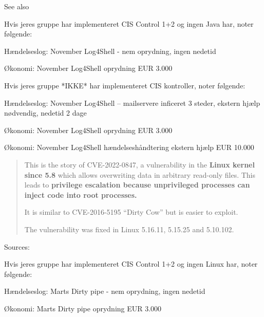 \documentclass[Screen16to9,17pt]{foils}
\begin{document}
See also 




Hvis jeres gruppe har implementeret CIS Control 1+2 og ingen Java har, noter følgende:
\begin{list2}
\item Hændelseslog: November Log4Shell - nem oprydning, ingen nedetid
\item Økonomi: November Log4Shell oprydning EUR 3.000
\end{list2}


Hvis jeres gruppe *IKKE* har implementeret CIS kontroller, noter følgende:
\begin{list2}
\item Hændelseslog: November Log4Shell -- mailservere inficeret 3 steder, ekstern hjælp nødvendig, nedetid 2 dage
\item Økonomi: November Log4Shell oprydning EUR 3.000
\item Økonomi: November Log4Shell hændelseshåndtering ekstern hjælp EUR 10.000
\end{list2}





\begin{quote}
This is the story of CVE-2022-0847, a vulnerability in the {\bf Linux kernel since 5.8} which allows overwriting data in arbitrary read-only files. This leads to {\bf privilege escalation because unprivileged processes can inject code into root processes.}

It is similar to CVE-2016-5195 “Dirty Cow” but is easier to exploit.

The vulnerability was fixed in Linux 5.16.11, 5.15.25 and 5.10.102.
\end{quote}
Sources:



Hvis jeres gruppe har implementeret CIS Control 1+2 og ingen Linux har, noter følgende:
\begin{list2}
\item Hændelseslog: Marts Dirty pipe - nem oprydning, ingen nedetid
\item Økonomi: Marts Dirty pipe oprydning EUR 3.000
\end{list2}
\end{document}
